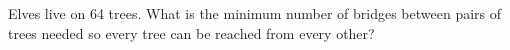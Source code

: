 Elves live on 64 trees. What is the minimum number of bridges between pairs of trees needed so every tree can be reached from every other?
